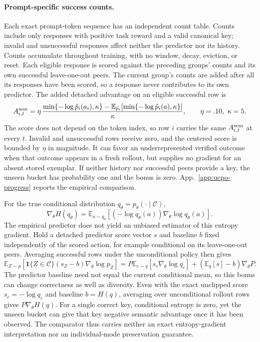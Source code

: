 \documentclass{article}
\newcommand{\1}{\mathbf 1}
\newcommand{\E}{\mathbb E}
\theoremstyle{remark}
\theoremstyle{definition}
\theoremstyle{plain}
\begin{document}
\paragraph{Prompt-specific success counts.}
Each exact prompt-token sequence has an independent count table. Counts
include only responses with positive task reward and a valid canonical
key; invalid and unsuccessful responses affect neither the predictor nor
its history. Counts accumulate throughout training, with no window, decay,
eviction, or reset. Each eligible response is scored against the preceding groups'
counts and its own successful leave-one-out peers. The current group's
counts are added after all its responses have been scored, so a response
never contributes to its own predictor.
The added detached advantage on an eligible successful row is
\begin{equation}
  A^{\rm sem}_{i,t}=\eta\,
  \frac{\min\{-\log\hat p_i(a_i),\kappa\}
    -\E_{\hat p_i}[\min\{-\log\hat p_i(a),\kappa\}]}{\kappa},
  \qquad \eta=.10,\ \kappa=5.
  \label{eq:legacy-semantic-advantage}
\end{equation}
The score does not depend on the token index, so row $i$ carries the same
$A^{\rm sem}_{i,t}$ at every $t$. Invalid and unsuccessful rows receive zero,
and the centered score is bounded by $\eta$ in magnitude. It can favor an
underrepresented verified outcome when that outcome appears in a fresh
rollout, but supplies no gradient for an absent stored exemplar. If neither
history nor successful peers provide a key, the unseen bucket has
probability one and the bonus is zero. App.~\ref{app:ucpo-progress} reports
the empirical comparison.

For the true conditional distribution $q_\theta=p_\theta(\cdot\mid\mathcal C)$,
\begin{equation}
 \nabla_\theta H(q_\theta)
 =\E_{a\sim q_\theta}[(-\log q_\theta(a))\nabla_\theta\log q_\theta(a)].
 \label{eq:entropy-score-function}
\end{equation}
The empirical predictor does not yield an unbiased estimator of this
entropy gradient. Hold a detached predictor score vector
$s$ and baseline $b$ fixed independently of the scored action, for example
conditional on its leave-one-out peers. Averaging successful rows under the
unconditional policy then gives
\[
 \E_{Z\sim p}[\1\{Z\in\mathcal C\}(s_Z-b)\nabla_\theta\log p_Z]
 =P\E_{c\sim q}[s_c\nabla_\theta\log q_c]
   +(\E_q[s]-b)\nabla_\theta P.
\]
The predictor baseline need not equal the current conditional mean, so
this bonus can change correctness as well as diversity. Even with the exact
unclipped score $s_c=-\log q_c$ and baseline $b=H(q)$, averaging over
unconditional rollout rows gives $P\nabla_\theta H(q)$.
For a single correct key, conditional entropy is zero, yet the unseen
bucket can give that key negative semantic advantage once it has been
observed. The comparator
thus carries neither an exact entropy-gradient interpretation nor an
individual-mode preservation guarantee.
\end{document}
